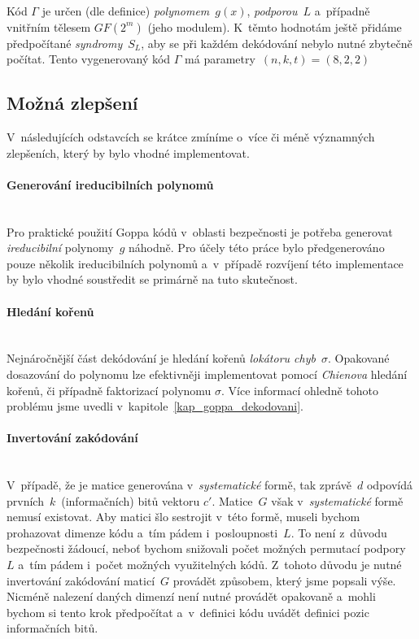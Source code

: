 \documentclass[thesis=M,czech,hidelinks]{FITthesis}[2012/06/26]
\newcommand{\0}{{\textcolor[gray]{0.75}{0}}}
\begin{document}
Kód $\Gamma$ je určen (dle definice) \emph{polynomem}~$g(x)$,
\emph{podporou}~$L$ a~případně vnitřním tělesem $GF(2^m)$ (jeho modulem).
K~těmto hodnotám ještě přidáme předpočítané \emph{syndromy}~$S_L$, aby se při
každém dekódování nebylo nutné zbytečně počítat. Tento vygenerovaný kód $\Gamma$
má parametry~$(n,k,t) = (8,2,2)$



\subsection{Možná zlepšení}\label{kap_goppa_zlepseni}

V~následujících odstavcích se krátce zmíníme o~více či méně významných
zlepšeních, který by bylo vhodné implementovat.

\paragraph{Generování ireducibilních polynomů} \hfil \\
Pro praktické použití Goppa kódů v~oblasti bezpečnosti je potřeba generovat
\emph{ireducibilní} polynomy~$g$ náhodně. Pro účely této práce bylo
předgenerováno pouze několik ireducibilních polynomů a~v~případě rozvíjení této
implementace by bylo vhodné soustředit se primárně na tuto skutečnost.

\paragraph{Hledání kořenů} \hfil \\
Nejnáročnější část dekódování je hledání kořenů \emph{lokátoru chyb}~$\sigma$.
Opakované dosazování do polynomu lze efektivněji implementovat pomocí
\emph{Chienova} hledání kořenů, či případně faktorizací polynomu $\sigma$. Více
informací ohledně tohoto problému jsme uvedli
v~kapitole~\ref{kap_goppa_dekodovani}.

\paragraph{Invertování zakódování} \hfil \\
V~případě, že je matice generována v~\emph{systematické} formě, tak zprávě~$d$
odpovídá prvních~$k$~(informačních) bitů vektoru $c'$. Matice~$G$ však
v~\emph{systematické} formě nemusí existovat. Aby matici šlo sestrojit v~této
formě, museli bychom prohazovat dimenze kódu a~tím pádem i~posloupnosti~$L$. To
není z~důvodu bezpečnosti žádoucí, neboť bychom snižovali počet možných
permutací podpory~$L$ a~tím pádem i~počet možných využitelných kódů. Z~tohoto
důvodu je nutné invertování zakódování maticí~$G$ provádět způsobem, který jsme
popsali výše.  Nicméně nalezení daných dimenzí není nutné provádět opakovaně
a~mohli bychom si tento krok předpočítat a~v~definici kódu uvádět definici pozic
informačních bitů.
\end{document}
